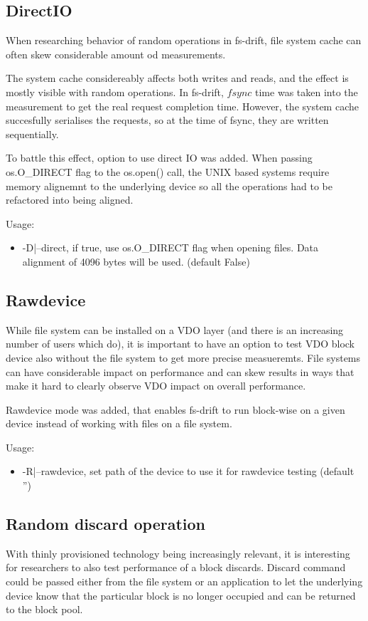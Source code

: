 \documentclass[
  color, %
  table, %
  lof,   %
  lot,   %
]{fithesis3}
\begin{document}
\subsection{DirectIO}
When researching behavior of random operations in fs-drift, file system cache can often skew considerable amount od measurements.


The system cache considereably affects both writes and reads, and the effect is mostly visible with random operations. In fs-drift, $fsync$ time was taken into the measurement to get the real request completion time. However, the system cache succesfully serialises the requests, so at the time of fsync, they are written sequentially.

To battle this effect, option to use direct IO was added. When passing os.O\_DIRECT flag to the os.open() call, the UNIX based systems require memory alignemnt to the underlying device so all the operations had to be refactored into being aligned.

Usage:
\begin{itemize}
    \item -D|--direct, if true, use os.O\_DIRECT flag when opening files. Data alignment of 4096 bytes will be used. (default False)
\end{itemize}

\subsection{Rawdevice}
While file system can be installed on a VDO layer (and there is an increasing number of users which do), it is important to have an option to test VDO block device also without the file system to get more precise measueremts. File systems can have considerable impact on performance and can skew results in ways that make it hard to clearly observe VDO impact on overall performance.

Rawdevice mode was added, that enables fs-drift to run block-wise on a given device instead of working with files on a file system.

Usage:
\begin{itemize}
    \item -R|--rawdevice, set path of the device to use it for rawdevice testing (default '')
\end{itemize}


\subsection{Random discard operation}
With thinly provisioned technology being increasingly relevant, it is interesting for researchers to also test performance of a block discards. Discard command could be passed either from the file system or an application to let the underlying device know that the particular block is no longer occupied and can be returned to the block pool.
\end{document}
